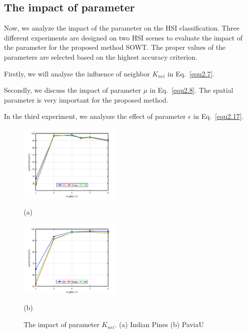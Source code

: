 \documentclass{ws-ijwmip}
\begin{document}
\subsection{The impact of parameter}
Now, we analyze the impact of the parameter on the HSI classification. Three different experiments are designed on two HSI scenes to evaluate the impact of the parameter for the proposed method SOWT. The proper values of the parameters are selected based on the highest accuracy criterion.
\begin{romanlist}[(ii)]
\item Firstly, we will analyse the influence of neighbor $K_{nei}$ in Eq.~\ref{equ2.7}.
\item Secondly, we discuss the impact of parameter $\mu$ in Eq.~\ref{equ2.8}. The spatial parameter is very important for the proposed method.
\item In the third experiment, we analysze the effect of parameter $\epsilon$ in Eq.~\ref{equ2.17}.
\end{romanlist}
\begin{figure}[bh]
        \centering
        \begin{minipage}[b]{0.45\linewidth}
            \centering
            \centerline{
            \includegraphics[width=5cm ]{image/indianPines_K}}
            \centerline{(a)}
            \medskip
        \end{minipage}
        \begin{minipage}[b]{0.45\linewidth}
            \centering
            \centerline{
            \includegraphics[width=5cm ]{image/paviaU_K}}
            \centerline{(b)}
            \medskip
        \end{minipage}
        \caption{The impact of parameter $K_{nei}$. (a) Indian Pines  (b) PaviaU}
        \label{figure3}
    \end{figure}
\end{document}

